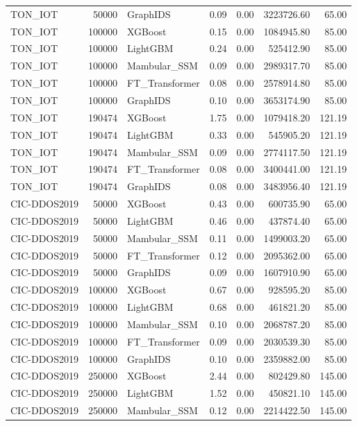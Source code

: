 \begin{table}[t]
\begin{tabular}{lrlrrrr}
TON_IOT & 50000 & GraphIDS & 0.09 & 0.00 & 3223726.60 & 65.00 \\
TON_IOT & 100000 & XGBoost & 0.15 & 0.00 & 1084945.80 & 85.00 \\
TON_IOT & 100000 & LightGBM & 0.24 & 0.00 & 525412.90 & 85.00 \\
TON_IOT & 100000 & Mambular_SSM & 0.09 & 0.00 & 2989317.70 & 85.00 \\
TON_IOT & 100000 & FT_Transformer & 0.08 & 0.00 & 2578914.80 & 85.00 \\
TON_IOT & 100000 & GraphIDS & 0.10 & 0.00 & 3653174.90 & 85.00 \\
TON_IOT & 190474 & XGBoost & 1.75 & 0.00 & 1079418.20 & 121.19 \\
TON_IOT & 190474 & LightGBM & 0.33 & 0.00 & 545905.20 & 121.19 \\
TON_IOT & 190474 & Mambular_SSM & 0.09 & 0.00 & 2774117.50 & 121.19 \\
TON_IOT & 190474 & FT_Transformer & 0.08 & 0.00 & 3400441.00 & 121.19 \\
TON_IOT & 190474 & GraphIDS & 0.08 & 0.00 & 3483956.40 & 121.19 \\
CIC-DDOS2019 & 50000 & XGBoost & 0.43 & 0.00 & 600735.90 & 65.00 \\
CIC-DDOS2019 & 50000 & LightGBM & 0.46 & 0.00 & 437874.40 & 65.00 \\
CIC-DDOS2019 & 50000 & Mambular_SSM & 0.11 & 0.00 & 1499003.20 & 65.00 \\
CIC-DDOS2019 & 50000 & FT_Transformer & 0.12 & 0.00 & 2095362.00 & 65.00 \\
CIC-DDOS2019 & 50000 & GraphIDS & 0.09 & 0.00 & 1607910.90 & 65.00 \\
CIC-DDOS2019 & 100000 & XGBoost & 0.67 & 0.00 & 928595.20 & 85.00 \\
CIC-DDOS2019 & 100000 & LightGBM & 0.68 & 0.00 & 461821.20 & 85.00 \\
CIC-DDOS2019 & 100000 & Mambular_SSM & 0.10 & 0.00 & 2068787.20 & 85.00 \\
CIC-DDOS2019 & 100000 & FT_Transformer & 0.09 & 0.00 & 2030539.30 & 85.00 \\
CIC-DDOS2019 & 100000 & GraphIDS & 0.10 & 0.00 & 2359882.00 & 85.00 \\
CIC-DDOS2019 & 250000 & XGBoost & 2.44 & 0.00 & 802429.80 & 145.00 \\
CIC-DDOS2019 & 250000 & LightGBM & 1.52 & 0.00 & 450821.10 & 145.00 \\
CIC-DDOS2019 & 250000 & Mambular_SSM & 0.12 & 0.00 & 2214422.50 & 145.00 \\

\end{tabular}
\end{table}
